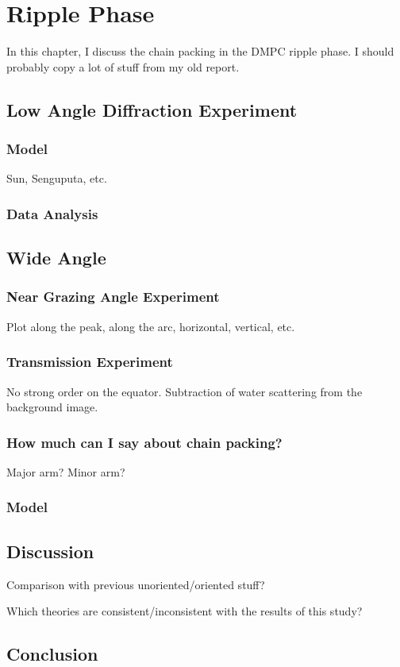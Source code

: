 \chapter{Ripple Phase}
In this chapter, I discuss the chain packing in the DMPC ripple phase. 
I should probably copy a lot of stuff from my old report.

\section{Low Angle Diffraction Experiment}
\subsection{Model}
Sun, Senguputa, etc.

\subsection{Data Analysis}

\section{Wide Angle}
\subsection{Near Grazing Angle Experiment}
Plot along the peak, along the arc, horizontal, vertical, etc.

\subsection{Transmission Experiment}
No strong order on the equator. Subtraction of water scattering from the
background image.

\subsection{How much can I say about chain packing?}
Major arm? Minor arm?

\subsection{Model}


\section{Discussion}
Comparison with previous unoriented/oriented stuff?

Which theories are consistent/inconsistent with the results of this study?


\section{Conclusion}